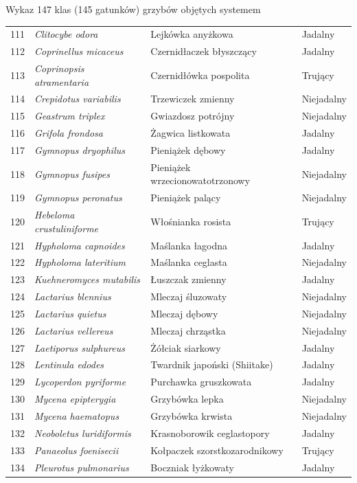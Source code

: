\begin{easyappendix}{Wykaz 147 klas (145 gatunków) grzybów objętych systemem}
\begin{longtable}{|r|l|l|l|}
111 & \textit{Clitocybe odora} & Lejkówka anyżkowa & Jadalny \\
112 & \textit{Coprinellus micaceus} & Czernidłaczek błyszczący & Jadalny \\
113 & \textit{Coprinopsis atramentaria} & Czernidłówka pospolita & Trujący\\
114 & \textit{Crepidotus variabilis} & Trzewiczek zmienny & Niejadalny \\
115 & \textit{Geastrum triplex} & Gwiazdosz potrójny & Niejadalny \\
116 & \textit{Grifola frondosa} & Żagwica listkowata & Jadalny \\
117 & \textit{Gymnopus dryophilus} & Pieniążek dębowy & Jadalny \\
118 & \textit{Gymnopus fusipes} & Pieniążek wrzecionowatotrzonowy & Niejadalny \\
119 & \textit{Gymnopus peronatus} & Pieniążek palący & Niejadalny \\
120 & \textit{Hebeloma crustuliniforme} & Włośnianka rosista & Trujący \\
121 & \textit{Hypholoma capnoides} & Maślanka łagodna & Jadalny \\
122 & \textit{Hypholoma lateritium} & Maślanka ceglasta & Niejadalny \\
123 & \textit{Kuehneromyces mutabilis} & Łuszczak zmienny & Jadalny \\
124 & \textit{Lactarius blennius} & Mleczaj śluzowaty & Niejadalny \\
125 & \textit{Lactarius quietus} & Mleczaj dębowy & Niejadalny \\
126 & \textit{Lactarius vellereus} & Mleczaj chrząstka & Niejadalny \\
127 & \textit{Laetiporus sulphureus} & Żółciak siarkowy & Jadalny \\
128 & \textit{Lentinula edodes} & Twardnik japoński (Shiitake) & Jadalny \\
129 & \textit{Lycoperdon pyriforme} & Purchawka gruszkowata & Jadalny \\
130 & \textit{Mycena epipterygia} & Grzybówka lepka & Niejadalny \\
131 & \textit{Mycena haematopus} & Grzybówka krwista & Niejadalny \\
132 & \textit{Neoboletus luridiformis} & Krasnoborowik ceglastopory & Jadalny \\
133 & \textit{Panaeolus foenisecii} & Kołpaczek szorstkozarodnikowy & Trujący \\
134 & \textit{Pleurotus pulmonarius} & Boczniak łyżkowaty & Jadalny \\

\end{longtable}
\end{easyappendix}
